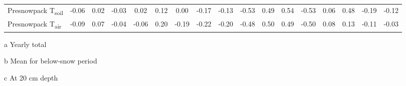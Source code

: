 \begin{sidewaystable}
\begin{threeparttable}
\begin{tabular}{lcccccccccccccccc}
            Presnowpack T\textsubscript{soil}\tnote{c}	&-0.06	&0.02	&-0.03	&0.02	&0.12	&0.00	&-0.17	&-0.13	&-0.53	&0.49	&0.54	&-0.53	&0.06	&0.48	&-0.19	&-0.12\\
            Presnowpack T\textsubscript{air}	&-0.09	&0.07	&-0.04	&-0.06	&0.20	&-0.19	&-0.22	&-0.20	&-0.48	&0.50	&0.49	&-0.50	&0.08	&0.13	&-0.11	&-0.03\\
            \bottomrule
        \end{tabular}
        \begin{tablenotes}
        \item [a] Yearly total
        \item [b] Mean for below-snow period
        \item [c] At 20 cm depth
        \end{tablenotes}
    \end{threeparttable}
\end{sidewaystable}
